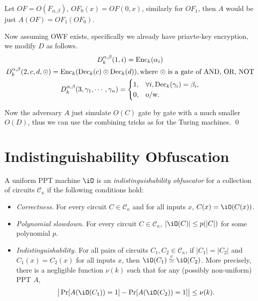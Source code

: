 \documentclass[12pt]{tufte-book}
\begin{document}
Let $OF= O(F_{\alpha,\beta})$, $OF_0(x) = OF(0,x)$, similarly for $OF_1$, then $A$ would be just $A(OF) = OF_1(OF_0)$.

Now assuming OWF exists, specifically we already have priavte-key encryption, we modify $D$ as follows.
\begin{gather*}
	D_k^{\alpha,\beta}(1,i) = \mathrm{Enc}_k(\alpha_i) \\
	D_k^{\alpha,\beta}(2,c,d,\odot) = \mathrm{Enc}_k(\mathrm{Dec}_k(c) \odot \mathrm{Dec}_k(d)), \hbox{where $\odot$ is a gate of AND, OR, NOT} \\
	D_k^{\alpha,\beta}(3, \gamma_1,\cdots,\gamma_n) =
	\begin{cases}
		1,& \forall i, \mathrm{Dec}_k(\gamma_i) = \beta_i,\\
		0, & \hbox{o/w}.
	\end{cases}
\end{gather*}

Now the adversary $A$ just simulate $O(C)$ gate by gate with a much smaller $O(D)$, thus we can use the combining tricks as for the Turing machines.
\qed

\section{Indistinguishability Obfuscation}




\newcommand{\Ck}{\ensuremath{\mathcal{C}_\kappa}}

\begin{definition}
A uniform PPT machine $\iO$ is an \emph{indistinguishability obfuscator}
for a collection of circuits $\Ck$ if the following conditions hold:
\begin{itemize}

\item \emph{Correctness.}
For every circuit $C \in \Ck$ and for all inputs $x$,
$C(x) = \iO(C(x))$.

\item \emph{Polynomial slowdown.}
For every circuit $C \in \Ck$, $|\iO(C)| \leq p(|C|)$ for some
polynomial $p$.

\item \emph{Indistinguishability.}
For all pairs of circuits $C_1, C_2 \in \Ck$, if $|C_1| = |C_2|$ and
$C_1(x) = C_2(x)$ for all inputs $x$, then
$\iO(C_1) \overset{c}{\simeq} \iO(C_2)$.
More precisely, there is a negligible function $\nu(k)$ such that for
any (possibly non-uniform) PPT $A$,
\begin{equation*}
\big| \Pr[A(\iO(C_1)) = 1] - \Pr[A(\iO(C_2)) = 1] \big| \leq \nu(k).
\end{equation*}

\end{itemize}
\end{definition}
\end{document}
